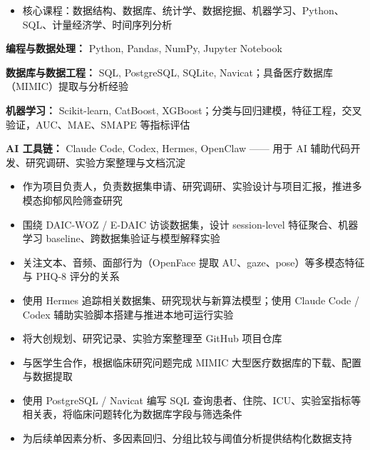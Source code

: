 \documentclass{common/resume}
\begin{document}

\begin{itemize}
  \item 核心课程：数据结构、数据库、统计学、数据挖掘、机器学习、Python、SQL、计量经济学、时间序列分析
\end{itemize}

\textbf{编程与数据处理：} Python, Pandas, NumPy, Jupyter Notebook

\textbf{数据库与数据工程：} SQL, PostgreSQL, SQLite, Navicat；具备医疗数据库（MIMIC）提取与分析经验

\textbf{机器学习：} Scikit-learn, CatBoost, XGBoost；分类与回归建模，特征工程，交叉验证，AUC、MAE、SMAPE 等指标评估

\textbf{AI 工具链：} Claude Code, Codex, Hermes, OpenClaw —— 用于 AI 辅助代码开发、研究调研、实验方案整理与文档沉淀


\begin{itemize}
  \item 作为项目负责人，负责数据集申请、研究调研、实验设计与项目汇报，推进多模态抑郁风险筛查研究
  \item 围绕 DAIC-WOZ / E-DAIC 访谈数据集，设计 session-level 特征聚合、机器学习 baseline、跨数据集验证与模型解释实验
  \item 关注文本、音频、面部行为（OpenFace 提取 AU、gaze、pose）等多模态特征与 PHQ-8 评分的关系
  \item 使用 Hermes 追踪相关数据集、研究现状与新算法模型；使用 Claude Code / Codex 辅助实验脚本搭建与推进本地可运行实验
  \item 将大创规划、研究记录、实验方案整理至 GitHub 项目仓库
\end{itemize}

\begin{itemize}
  \item 与医学生合作，根据临床研究问题完成 MIMIC 大型医疗数据库的下载、配置与数据提取
  \item 使用 PostgreSQL / Navicat 编写 SQL 查询患者、住院、ICU、实验室指标等相关表，将临床问题转化为数据库字段与筛选条件
  \item 为后续单因素分析、多因素回归、分组比较与阈值分析提供结构化数据支持
\end{itemize}
\end{document}

